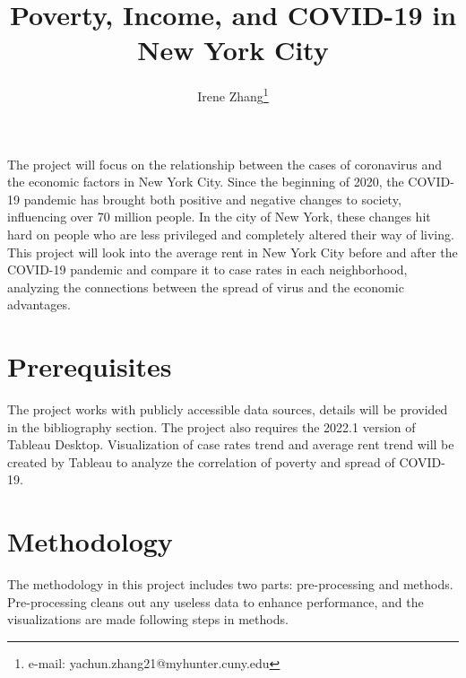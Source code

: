 \documentclass{vgtc}                 %
\title{Poverty, Income, and COVID-19 in New York City}
\author{Irene Zhang\thanks{e-mail: yachun.zhang21@myhunter.cuny.edu}}
\begin{document}


\maketitle

The project will focus on the relationship between the cases of coronavirus and the economic factors in New York City. Since the beginning of 2020, the COVID-19 pandemic has brought both positive and negative changes to society, influencing over 70 million people. In the city of New York, these changes hit hard on people who are less privileged and completely altered their way of living. This project will look into the average rent in New York City before and after the COVID-19 pandemic and compare it to case rates in each neighborhood, analyzing the connections between the spread of virus and the economic advantages. 

\section{Prerequisites}

The project works with publicly accessible data sources, details will be provided in the bibliography section. The project also requires the 2022.1 version of Tableau Desktop. Visualization of case rates trend and average rent trend will be created by Tableau to analyze the correlation of poverty and spread of COVID-19.

\section{Methodology}

The methodology in this project includes two parts: pre-processing and methods. Pre-processing cleans out any useless data to enhance performance, and the visualizations are made following steps in methods.
\end{document}
